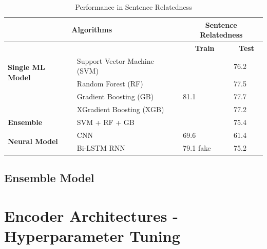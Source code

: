 \documentclass[12pt]{report} %
\begin{document}
\begin{table}[]
	\centering
	\caption{Performance in Sentence Relatedness}
	\label{my-label}
	\begin{tabular}{|l|l|l|l|}
		\hline
		\multicolumn{2}{|c|}{\textbf{Algorithms}}                                     & \multicolumn{2}{c|}{\textbf{Sentence Relatedness}}                       \\ \hline
		&                              & \multicolumn{1}{c|}{\textbf{Train}} & \multicolumn{1}{c|}{\textbf{Test}} \\ \hline
		\multirow{2}{*}{\textbf{Single ML Model}} & Support Vector Machine (SVM) &                                     & 76.2                               \\ \cline{2-4}
		& Random Forest (RF)           &                                     & 77.5                               \\ \cline{2-4}
		& Gradient Boosting (GB)       & 81.1                                & 77.7                               \\ \cline{2-4}
		\textbf{}                                      & XGradient Boosting (XGB)     &                                     & 77.2                               \\ \hline
		\textbf{Ensemble}                              & SVM + RF + GB                &                                     & 75.4                               \\ \hline
		\multirow{2}{*}{\textbf{Neural Model}}         & CNN                          & 69.6                                & 61.4                               \\ \cline{2-4} 
		& Bi-LSTM RNN                  & 79.1 fake                           & 75.2                               \\ \hline
	\end{tabular}
\end{table}

\subsection{Ensemble Model}



\section{Encoder Architectures - Hyperparameter Tuning}
\end{document}
